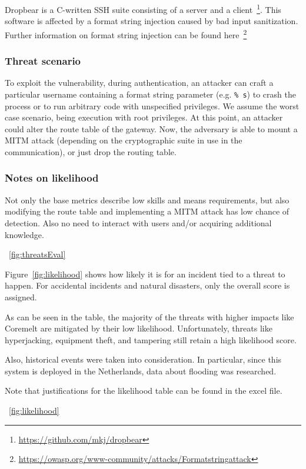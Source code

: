 Dropbear is a C-written SSH suite consisting of a server and a client~\footnote{\href{https://github.com/mkj/dropbear} {https://github.com/mkj/dropbear}}. This software is affected by a format string injection caused by bad input sanitization. Further information on format string injection can be found here~\footnote{\href{https://owasp.org/www-community/attacks/Format_string_attack} {https://owasp.org/www-community/attacks/Format\textunderscore string\textunderscore attack}}

\subsubsection*{Threat scenario}

To exploit the vulnerability, during authentication, an attacker can craft a particular username containing a format string parameter (e.g. \texttt{\% s}) to crash the process or to run arbitrary code with unspecified privileges. We assume the worst case scenario, being execution with root privileges. At this point, an attacker could alter the route table of the gateway. Now, the adversary is able to mount a MITM attack (depending on the cryptographic suite in use in the communication), or just drop the routing table.

\subsubsection*{Notes on likelihood}

Not only the base metrics describe low skills and means requirements, but also modifying the route table and implementing a MITM attack has low chance of detection. Also no need to interact with users and/or acquiring additional knowledge.

~\ref{fig:threatsEval}


\newpage

Figure~\ref{fig:likelihood} shows how likely it is for an incident tied to a threat to happen. For accidental incidents and natural disasters, only the overall score is assigned.

As can be seen in the table, the majority of the threats with higher impacts like Coremelt are mitigated by their low likelihood. Unfortunately, threats like hyperjacking, equipment theft, and tampering still retain a high likelihood score.

Also, historical events were taken into consideration. In particular, since this system is deployed in the Netherlands, data about flooding was researched\cite{online:flooding}.

Note that justifications for the likelihood table can be found in the excel file.

~\ref{fig:likelihood}
